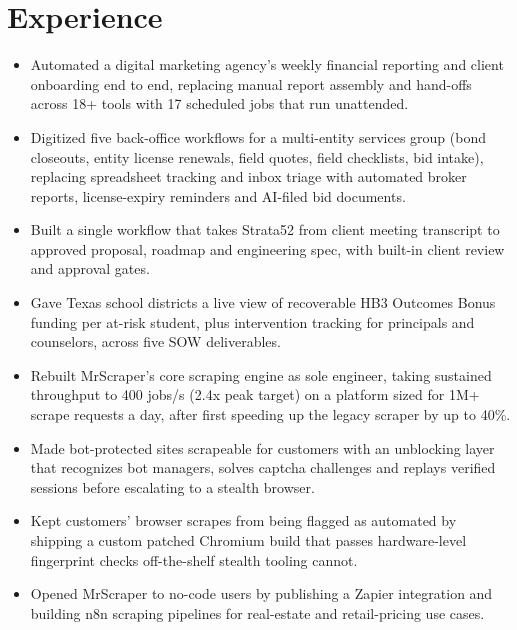 \section*{Experience}
\begin{itemize}[leftmargin=*, topsep=0pt]
    \item Automated a digital marketing agency's weekly financial reporting and client onboarding end to end, replacing manual report assembly and hand-offs across 18+ tools with 17 scheduled jobs that run unattended.
    \item Digitized five back-office workflows for a multi-entity services group (bond closeouts, entity license renewals, field quotes, field checklists, bid intake), replacing spreadsheet tracking and inbox triage with automated broker reports, license-expiry reminders and AI-filed bid documents.
    \item Built a single workflow that takes Strata52 from client meeting transcript to approved proposal, roadmap and engineering spec, with built-in client review and approval gates.
    \item Gave Texas school districts a live view of recoverable HB3 Outcomes Bonus funding per at-risk student, plus intervention tracking for principals and counselors, across five SOW deliverables.
\end{itemize}
\vspace{0.5em}
\begin{itemize}[leftmargin=*, topsep=0pt]
    \item Rebuilt MrScraper's core scraping engine as sole engineer, taking sustained throughput to 400 jobs/s (2.4x peak target) on a platform sized for 1M+ scrape requests a day, after first speeding up the legacy scraper by up to 40\%.
    \item Made bot-protected sites scrapeable for customers with an unblocking layer that recognizes bot managers, solves captcha challenges and replays verified sessions before escalating to a stealth browser.
    \item Kept customers' browser scrapes from being flagged as automated by shipping a custom patched Chromium build that passes hardware-level fingerprint checks off-the-shelf stealth tooling cannot.
    \item Opened MrScraper to no-code users by publishing a Zapier integration and building n8n scraping pipelines for real-estate and retail-pricing use cases.
\end{itemize}

